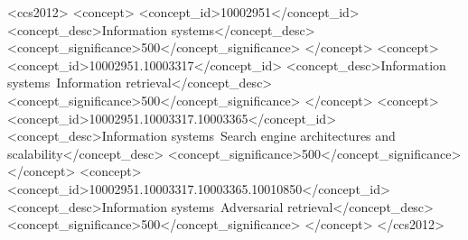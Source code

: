 




\begin{CCSXML}
<ccs2012>
   <concept>
       <concept_id>10002951</concept_id>
       <concept_desc>Information systems</concept_desc>
       <concept_significance>500</concept_significance>
       </concept>
   <concept>
       <concept_id>10002951.10003317</concept_id>
       <concept_desc>Information systems~Information retrieval</concept_desc>
       <concept_significance>500</concept_significance>
       </concept>
   <concept>
       <concept_id>10002951.10003317.10003365</concept_id>
       <concept_desc>Information systems~Search engine architectures and scalability</concept_desc>
       <concept_significance>500</concept_significance>
       </concept>
   <concept>
       <concept_id>10002951.10003317.10003365.10010850</concept_id>
       <concept_desc>Information systems~Adversarial retrieval</concept_desc>
       <concept_significance>500</concept_significance>
       </concept>
 </ccs2012>
\end{CCSXML}


